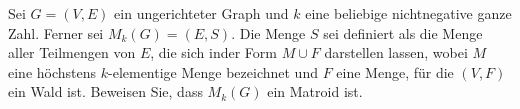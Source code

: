 
\begin{exercise}

Sei $G = (V, E)$ ein ungerichteter Graph und $k$ eine beliebige nichtnegative ganze Zahl. Ferner sei $M_k(G) = (E, S)$. Die Menge $S$ sei definiert als die Menge aller Teilmengen von $E$, die sich inder Form $M \cup F$ darstellen lassen, wobei $M$ eine höchstens $k$-elementige Menge bezeichnet und $F$ eine Menge, für die $(V, F)$ ein Wald ist. Beweisen Sie, dass $M_k(G)$ ein Matroid ist.

\end{exercise}


